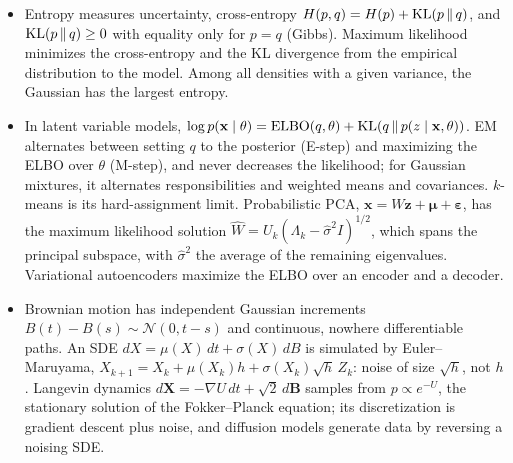 \begin{itemize}[leftmargin=*]
    \item Entropy measures uncertainty, cross-entropy $H(p, q) = H(p) + \operatorname{KL}(p \,\|\, q)$, and $\operatorname{KL}(p \,\|\, q) \geq 0$ with equality only for $p = q$ (Gibbs). Maximum likelihood minimizes the cross-entropy and the KL divergence from the empirical distribution to the model. Among all densities with a given variance, the Gaussian has the largest entropy.
    \item In latent variable models, $\log p(\mathbf{x} \mid \theta) = \mathrm{ELBO}(q, \theta) + \operatorname{KL}(q \,\|\, p(z \mid \mathbf{x}, \theta))$. EM alternates between setting $q$ to the posterior (E-step) and maximizing the ELBO over $\theta$ (M-step), and never decreases the likelihood; for Gaussian mixtures, it alternates responsibilities and weighted means and covariances. $k$-means is its hard-assignment limit. Probabilistic PCA, $\mathbf{x} = W\mathbf{z} + \boldsymbol{\mu} + \boldsymbol{\varepsilon}$, has the maximum likelihood solution $\hat W = U_k(\Lambda_k - \hat\sigma^2I)^{1/2}$, which spans the principal subspace, with $\hat\sigma^2$ the average of the remaining eigenvalues. Variational autoencoders maximize the ELBO over an encoder and a decoder.
    \item Brownian motion has independent Gaussian increments $B(t) - B(s) \sim \mathcal{N}(0, t - s)$ and continuous, nowhere differentiable paths. An SDE $dX = \mu(X)\,dt + \sigma(X)\,dB$ is simulated by Euler--Maruyama, $X_{k+1} = X_k + \mu(X_k)h + \sigma(X_k)\sqrt{h}\,Z_k$: noise of size $\sqrt{h}$, not $h$. Langevin dynamics $d\mathbf{X} = -\nabla U\,dt + \sqrt{2}\,d\mathbf{B}$ samples from $p \propto e^{-U}$, the stationary solution of the Fokker--Planck equation; its discretization is gradient descent plus noise, and diffusion models generate data by reversing a noising SDE.
\end{itemize}

